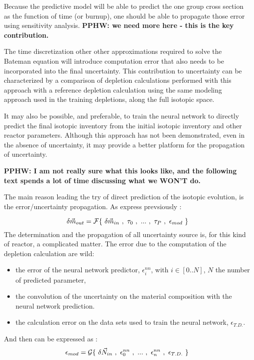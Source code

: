 \documentclass[dvips,12pt]{article}
\newcommand{\comment}[1]
{{\bfseries \color{red} #1}}
\begin{document}
Because the predictive model will be able to
predict the one group cross section as the
function of time (or burnup), one should be able
to propagate those error using sensitivity
analysis.  \comment{PPHW: we need more here - this
  is the key contribution.}

The time discretization other other approximations
required to solve the Bateman equation will
introduce computation error that also needs to be
incorporated into the final uncertainty. This
contribution to uncertainty can be characterized
by a comparison of depletion calculations
performed with this approach with a reference
depletion calculation using the same modeling
approach used in the training depletions, along
the full isotopic space.


It may also be possible, and preferable, to train
the neural network to directly predict the final
isotopic inventory from the initial isotopic
inventory and other reactor parameters.  Although
this approach has not been demonstrated, even in
the absence of uncertainty, it may provide a
better platform for the propagation of
uncertainty.

\comment{PPHW: I am not really sure what this
  looks like, and the following text spends a lot
  of time discussing what we WON'T do.}

The main reason leading the try of direct
prediction of the isotopic evolution, is the
error/uncertainty propagation. As express
prevsiously :

\begin{equation}
\delta \vec{m}_{out} = {\cal F}\{~\delta\vec{m}_{in}~,~\tau_0~,~...~,~\tau_P~,~\epsilon_{mod}~\}
\end{equation}
The determination and the propagation of all
uncertainty source is, for this kind of reactor, a
complicated matter. The error due to the
computation of the depletion calculation are wild:
\begin{itemize}
\item the error of the neural network predictor,
  $\epsilon^{nn}_{i}$, with $i\in[0..N]$, $N$ the
  number of predicted parameter,
\item the convolution of the uncertainty on the
  material composition with the neural network
  prediction.
\item the calculation error on the data sets used
  to train the neural network, $\epsilon_{T.D.}$.
\end{itemize}
And then can be expressed as :
\begin{equation}
\epsilon_{mod} = {\cal G}\{~\delta\vec{N}_{in}~,~\epsilon^{nn}_{0}~,~...~,~\epsilon^{nn}_{n}~,~\epsilon_{T.D.}~\}
\end{equation}
\end{document}
